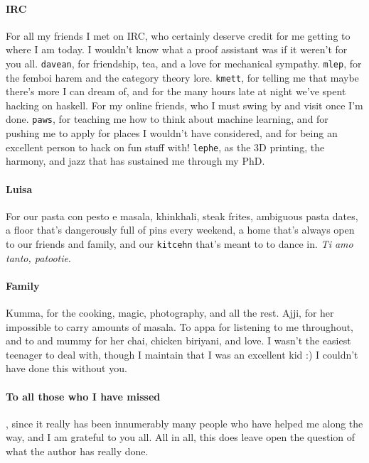 \paragraph{IRC}
For all my friends I met on IRC, who certainly deserve credit for me getting to where I am today.
I wouldn't know what a proof assistant was if it weren't for you all.
\texttt{davean}, for friendship, tea, and a love for mechanical sympathy.
\texttt{mlep}, for the femboi harem and the category theory lore.
\texttt{kmett}, for telling me that maybe there's more I can dream of,
and for the many hours late at night we've spent hacking on haskell.
For my online friends, who I must swing by and visit once I'm done.
\texttt{paws}, for teaching me how to think about machine learning,
and for pushing me to apply for places I wouldn't have considered,
and for being an excellent person to hack on fun stuff with!
\texttt{lephe}, as the 3D printing, the harmony, and jazz that has sustained me through my PhD.

\paragraph{Luisa} For our pasta con pesto e masala, khinkhali, steak frites,
ambiguous pasta dates,
a floor that's dangerously full of pins every weekend,
a home that's always open to our friends and family,
and our \texttt{kitcehn} that's meant to to dance in.
\emph{Ti amo tanto, patootie}.

\paragraph{Family} Kumma, for the cooking, magic, photography, and all the rest. 
Ajji, for her impossible to carry amounts of masala.
To appa for listening to me throughout,
and to and mummy for her chai, chicken biriyani, and love.
I wasn't the easiest teenager to deal with, though I maintain that I was an excellent kid :)
I couldn't have done this without you.

\paragraph{To all those who I have missed}, since it really has been innumerably many people who have helped me along the way, and I am grateful to you all.
All in all, this does leave open the question of what the author has really done.


